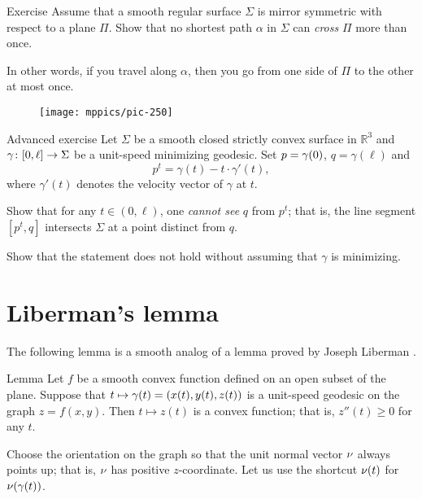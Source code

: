 \begin{thm}{Exercise}\label{ex:min-geod+plane}
Assume that a smooth regular surface $\Sigma$ is mirror symmetric with respect to a plane $\Pi$.
Show that no shortest path $\alpha$ in $\Sigma$ can {}\emph{cross} $\Pi$ more than once.


In other words, if you travel along $\alpha$, then you go from one side of $\Pi$ to the other at most once. 
\end{thm}

{

\begin{wrapfigure}{r}{40 mm}
\vskip-8mm
\centering
\texttt{[image: mppics/pic-250]}
\vskip-0mm
\end{wrapfigure}

\begin{thm}{Advanced exercise}\label{ex:milka}
Let $\Sigma$ be a smooth closed strictly convex surface 
in $\mathbb{R}^3$ 
and $\gamma\:[0,\ell]\z\to \Sigma$ be a unit-speed minimizing geodesic.
Set $p\z=\gamma(0)$, $q=\gamma(\ell)$ and 
$$p^t=\gamma(t)-t\cdot\gamma'(t),$$ 
where $\gamma'(t)$ denotes the velocity vector of $\gamma$ at $t$.

Show that for any $t\in (0,\ell)$,
one {}\emph{cannot see} $q$ from $p^t$;
that is, the line segment $[p^t,q]$ intersects $\Sigma$ at a point distinct from $q$.

Show that the statement does not hold without assuming that $\gamma$ is minimizing.
\end{thm}

}

\section{Liberman's lemma}

The following lemma is a smooth analog of a lemma proved by Joseph Liberman \cite{liberman}.

\begin{thm}{Lemma}
\label{lem:liberman}
Let $f$ be a smooth convex function defined on an open subset of the plane.
Suppose that $t\mapsto \gamma(t)\z=(x(t),y(t),z(t))$ is a unit-speed geodesic on the graph $z=f(x,y)$.
Then $t\mapsto z(t)$ is a convex function; that is, $z''(t)\ge 0$ for any $t$.
\end{thm}

Choose the orientation on the graph so that the unit normal vector $\nu$ always points up;
that is, $\nu$ has positive $z$-coordinate.
Let us use the shortcut $\nu(t)$ for $\nu(\gamma(t))$.

